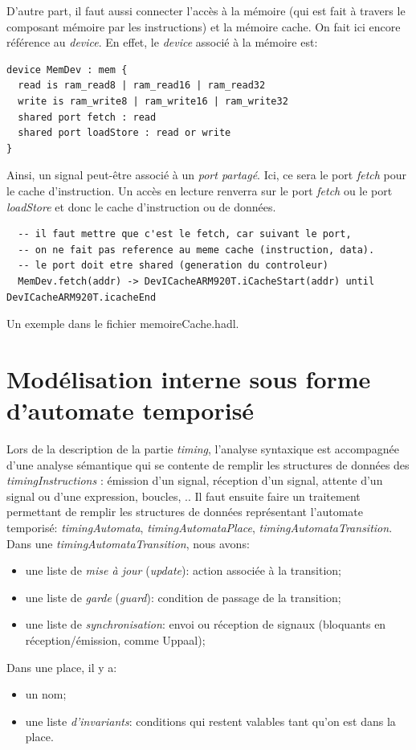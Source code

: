 \documentclass[11pt,a4paper]{article}
\begin{document}
D'autre part, il faut aussi connecter l'accès à la mémoire (qui est fait à travers le composant mémoire par les instructions) et la mémoire cache. On fait ici encore référence au \emph{device}. En effet, le \emph{device} associé à la mémoire est:
 \begin{lstlisting}
device MemDev : mem {
  read is ram_read8 | ram_read16 | ram_read32 
  write is ram_write8 | ram_write16 | ram_write32
  shared port fetch : read
  shared port loadStore : read or write
}
\end{lstlisting}
Ainsi, un signal peut-être associé à un \emph{port partagé}. Ici, ce sera le port \emph{fetch} pour le cache d'instruction. Un accès en lecture renverra sur le port \emph{fetch} ou le port \emph{loadStore} et donc le cache d'instruction ou de données.
 \begin{lstlisting}
  -- il faut mettre que c'est le fetch, car suivant le port, 
  -- on ne fait pas reference au meme cache (instruction, data).
  -- le port doit etre shared (generation du controleur)
  MemDev.fetch(addr) -> DevICacheARM920T.iCacheStart(addr) until DevICacheARM920T.icacheEnd
\end{lstlisting}

Un exemple dans le fichier memoireCache.hadl.
\section{Modélisation interne sous forme d'automate temporisé}
Lors de la description de la partie \emph{timing}, l'analyse syntaxique est accompagnée d'une analyse sémantique qui se contente de remplir les structures de données des \emph{timingInstructions} : émission d'un signal, réception d'un signal, attente d'un signal ou d'une expression, boucles, ..
Il faut ensuite faire un traitement permettant de remplir les structures de données représentant l'automate temporisé: \emph{timingAutomata}, \emph{timingAutomataPlace}, \emph{timingAutomataTransition}. Dans une \emph{timingAutomataTransition}, nous avons:
\begin{itemize}
\item une liste de \emph{mise à jour} (\emph{update}): action associée à la transition;
\item une liste de \emph{garde} (\emph{guard}): condition de passage de la transition;
\item une liste de \emph{synchronisation}: envoi ou réception de signaux (bloquants en réception/émission, comme Uppaal);
\end{itemize}
Dans une place, il y a:
\begin{itemize}
\item un nom;
\item une liste \emph{d'invariants}: conditions qui restent valables tant qu'on est dans la place.
\end{itemize}
\end{document}
